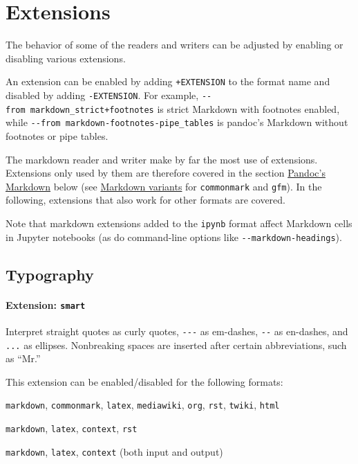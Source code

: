 \documentclass[
  a4paper,
]{article}
\providecommand{\tightlist}{%
  \setlength{\itemsep}{0pt}\setlength{\parskip}{0pt}}
\begin{document}
\hypertarget{extensions}{%
\section{Extensions}\label{extensions}}

The behavior of some of the readers and writers can be adjusted by
enabling or disabling various extensions.

An extension can be enabled by adding \texttt{+EXTENSION} to the format
name and disabled by adding \texttt{-EXTENSION}. For example,
\texttt{-\/-from\ markdown\_strict+footnotes} is strict Markdown with
footnotes enabled, while
\texttt{-\/-from\ markdown-footnotes-pipe\_tables} is pandoc's Markdown
without footnotes or pipe tables.

The markdown reader and writer make by far the most use of extensions.
Extensions only used by them are therefore covered in the section
\protect\hyperlink{pandocs-markdown}{Pandoc's Markdown} below (see
\protect\hyperlink{markdown-variants}{Markdown variants} for
\texttt{commonmark} and \texttt{gfm}). In the following, extensions that
also work for other formats are covered.

Note that markdown extensions added to the \texttt{ipynb} format affect
Markdown cells in Jupyter notebooks (as do command-line options like
\texttt{-\/-markdown-headings}).

\hypertarget{typography}{%
\subsection{Typography}\label{typography}}

\hypertarget{extension-smart}{%
\paragraph{\texorpdfstring{Extension:
\texttt{smart}}{Extension: smart}}\label{extension-smart}}

Interpret straight quotes as curly quotes, \texttt{-\/-\/-} as
em-dashes, \texttt{-\/-} as en-dashes, and \texttt{...} as ellipses.
Nonbreaking spaces are inserted after certain abbreviations, such as
``Mr.''

This extension can be enabled/disabled for the following formats:

\begin{description}
\tightlist
\item[input formats]
\texttt{markdown}, \texttt{commonmark}, \texttt{latex},
\texttt{mediawiki}, \texttt{org}, \texttt{rst}, \texttt{twiki},
\texttt{html}
\item[output formats]
\texttt{markdown}, \texttt{latex}, \texttt{context}, \texttt{rst}
\item[enabled by default in]
\texttt{markdown}, \texttt{latex}, \texttt{context} (both input and
output)
\end{description}
\end{document}
